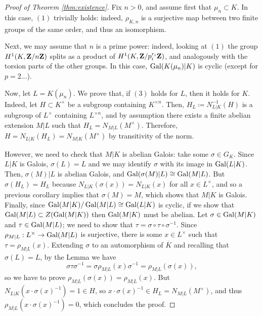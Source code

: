 \documentclass{article}
\begin{document}
\begin{proof}[Proof of Theorem \ref{thm:existence}]
Fix $n>0$, and assume first that $\mu_n\subset K$. In this case, $(1)$ trivially holds: indeed, $\rho_{K,n}$ is a surjective map between two finite groups of the same order, and thus an isomorphism.

Next, we may assume that $n$ is a prime power: indeed, looking at $(1)$ the group $H^1(K,\mathbf{Z}/n\mathbf{Z})$ splits as a product of $H^1(K,\mathbf{Z}/p_i^{r_i}\mathbf{Z})$, and analogously with the torsion parts of the other groups. In this case, $\operatorname{Gal}(K(\mu_n)|K)$ is cyclic (except for $p=2$...).

Now, let $L=K(\mu_n)$. We prove that, if $(3)$ holds for $L$, then it holds for $K$. Indeed, let $H\subset K^\times$ be a subgroup containing $K^{\times n}$. Then, $H_L\coloneqq N^{-1}_{L|K}(H)$ is a subgroup of $L^\times$ containing $L^{\times n}$, and by assumption there exists a finite abelian extension $M|L$ such that $H_L=N_{M|L}(M^\times)$. Therefore, $H=N_{L|K}(H_L)=N_{M|K}(M^\times)$ by transitivity of the norm.

However, we need to check that $M|K$ is abelian Galois: take some $\sigma \in G_K$. Since $L|K$ is Galois, $\sigma(L)=L$ and we may identify $\sigma$ with its image in $\operatorname{Gal}(L|K)$. Then, $\sigma(M)|L$ is abelian Galois, and $\operatorname{Gal}(\sigma(M)|L)\cong \operatorname{Gal}(M|L)$. But $\sigma(H_L)=H_L$ because $N_{L|K}(\sigma(x))=N_{L|K}(x)$ for all $x \in L^\times$, and so a previous corollary implies that $\sigma(M)=M$, which shows that $M|K$ is Galois. Finally, since $\operatorname{Gal}(M|K)/\operatorname{Gal}(M|L)\cong \operatorname{Gal}(L|K)$ is cyclic, if we show that $\operatorname{Gal}(M|L)\subset Z(\operatorname{Gal}(M|K))$ then $\operatorname{Gal}(M|K)$ must be abelian. Let $\sigma\in \operatorname{Gal}(M|K)$ and $\tau\in \operatorname{Gal}(M|L)$; we need to show that $\tau = \sigma \circ \tau \circ \sigma^{-1}$. Since $\rho_{M|L}:L^\times \to \operatorname{Gal}(M|L)$ is surjective, there is some $x\in L^\times$ such that $\tau=\rho_{M|L}(x)$. Extending $\sigma$ to an automorphism of $\overline{K}$ and recalling that $\sigma(L)=L$, by the Lemma we have
\[
	\sigma\tau\sigma^{-1} = \sigma \rho_{M|L}(x) \sigma^{-1} = \rho_{M|L}(\sigma(x)),
\]
so we have to prove $\rho_{M|L}(\sigma(x))=\rho_{M|L}(x)$. But $N_{L|K}(x\cdot \sigma(x)^{-1})=1\in H$, so $x\cdot \sigma(x)^{-1}\in H_L=N_{M|L}(M^\times)$, and thus $\rho_{M|L}(x\cdot \sigma(x)^{-1})=0$, which concludes the proof.
\end{proof}

\end{document}
